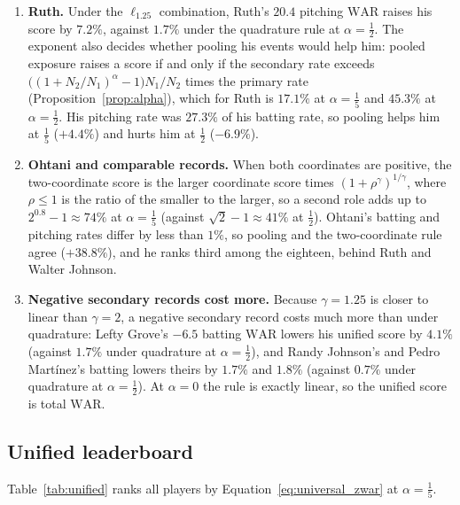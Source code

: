 \documentclass[11pt,letterpaper]{article}
\theoremstyle{plain}
\theoremstyle{definition}
\theoremstyle{remark}
\newcommand{\WAR}{\mathrm{WAR}}
\begin{document}
\begin{enumerate}
    \item \textbf{Ruth.} Under the $\ell_{1.25}$ combination, Ruth's $20.4$ pitching $\WAR$ raises his score by $7.2\%$, against $1.7\%$ under the quadrature rule at $\alpha = \tfrac12$. The exponent also decides whether pooling his events would help him: pooled exposure raises a score if and only if the secondary rate exceeds $\bigl((1 + N_2/N_1)^{\alpha} - 1\bigr)N_1/N_2$ times the primary rate (Proposition~\ref{prop:alpha}), which for Ruth is $17.1\%$ at $\alpha = \tfrac15$ and $45.3\%$ at $\alpha = \tfrac12$. His pitching rate was $27.3\%$ of his batting rate, so pooling helps him at $\tfrac15$ ($+4.4\%$) and hurts him at $\tfrac12$ ($-6.9\%$).
    \item \textbf{Ohtani and comparable records.} When both coordinates are positive, the two-coordinate score is the larger coordinate score times $(1 + \rho^{\gamma})^{1/\gamma}$, where $\rho \le 1$ is the ratio of the smaller to the larger, so a second role adds up to $2^{0.8} - 1 \approx 74\%$ at $\alpha = \tfrac15$ (against $\sqrt2 - 1 \approx 41\%$ at $\tfrac12$). Ohtani's batting and pitching rates differ by less than $1\%$, so pooling and the two-coordinate rule agree ($+38.8\%$), and he ranks third among the eighteen, behind Ruth and Walter Johnson.
    \item \textbf{Negative secondary records cost more.} Because $\gamma = 1.25$ is closer to linear than $\gamma = 2$, a negative secondary record costs much more than under quadrature: Lefty Grove's $-6.5$ batting $\WAR$ lowers his unified score by $4.1\%$ (against $1.7\%$ under quadrature at $\alpha = \tfrac12$), and Randy Johnson's and Pedro Mart\'{i}nez's batting lowers theirs by $1.7\%$ and $1.8\%$ (against $0.7\%$ under quadrature at $\alpha = \tfrac12$). At $\alpha = 0$ the rule is exactly linear, so the unified score is total $\WAR$.
\end{enumerate}

\subsection{Unified leaderboard}
\label{sec:unified_empirical}

Table~\ref{tab:unified} ranks all players by Equation~\eqref{eq:universal_zwar} at $\alpha = \tfrac15$.
\end{document}

